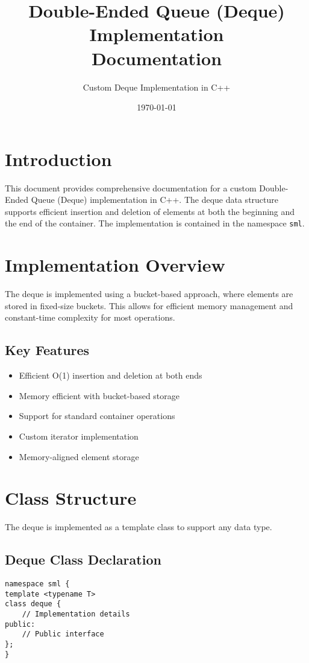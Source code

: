 \documentclass[a4paper,12pt]{article}
\title{\textbf{Double-Ended Queue (Deque) Implementation\\Documentation}}
\author{Custom Deque Implementation in C++}
\date{\today}
\begin{document}
\maketitle
\tableofcontents
\newpage

\section{Introduction}
This document provides comprehensive documentation for a custom Double-Ended Queue (Deque) implementation in C++. The deque data structure supports efficient insertion and deletion of elements at both the beginning and the end of the container. The implementation is contained in the namespace \texttt{sml}.

\section{Implementation Overview}
The deque is implemented using a bucket-based approach, where elements are stored in fixed-size buckets. This allows for efficient memory management and constant-time complexity for most operations.

\subsection{Key Features}
\begin{itemize}
    \item Efficient O(1) insertion and deletion at both ends
    \item Memory efficient with bucket-based storage
    \item Support for standard container operations
    \item Custom iterator implementation
    \item Memory-aligned element storage
\end{itemize}

\section{Class Structure}
The deque is implemented as a template class to support any data type.

\subsection{Deque Class Declaration}
\begin{lstlisting}
namespace sml {
template <typename T>
class deque {
    // Implementation details
public:
    // Public interface
};
}
\end{lstlisting}
\end{document}

